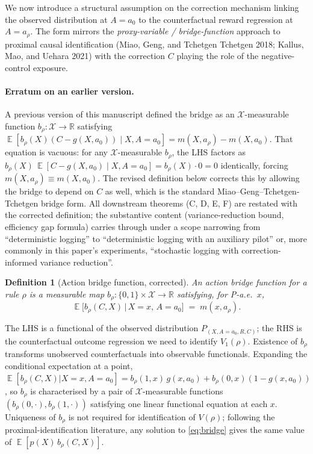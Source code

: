 \documentclass[11pt]{article}
\newtheorem{definition}{Definition}
\DeclareMathOperator{\E}{\mathbb{E}}
\begin{document}
We now introduce a structural assumption on the correction mechanism
linking the observed distribution at $A = a_0$ to the counterfactual
reward regression at $A = a_\rho$.  The form mirrors the
\emph{proxy-variable / bridge-function} approach to proximal causal
identification (Miao, Geng, and Tchetgen Tchetgen 2018; Kallus, Mao,
and Uehara 2021) with the correction $C$ playing the role of the
negative-control exposure.

\paragraph{Erratum on an earlier version.}
A previous version of this manuscript defined the bridge as an
$\mathcal{X}$-measurable function $b_\rho: \mathcal{X} \to \mathbb{R}$
satisfying $\E[b_\rho(X)(C - g(X, a_0)) \mid X, A = a_0] = m(X, a_\rho) - m(X, a_0)$.
That equation is vacuous: for any $\mathcal{X}$-measurable $b_\rho$,
the LHS factors as $b_\rho(X)\,\E[C - g(X, a_0) \mid X, A = a_0] = b_\rho(X)\cdot 0 = 0$
identically, forcing $m(X, a_\rho) \equiv m(X, a_0)$.  The revised
definition below corrects this by allowing the bridge to depend on $C$
as well, which is the standard Miao--Geng--Tchetgen-Tchetgen bridge
form.  All downstream theorems (C, D, E, F) are restated with the
corrected definition; the substantive content (variance-reduction
bound, efficiency gap formula) carries through under a scope
narrowing from ``deterministic logging'' to ``deterministic logging
with an auxiliary pilot'' or, more commonly in this paper's
experiments, ``stochastic logging with correction-informed variance
reduction''.

\begin{definition}[Action bridge function, corrected]\label{def:bridge}
An \emph{action bridge function} for a rule $\rho$ is a measurable
map $b_\rho: \{0, 1\} \times \mathcal{X} \to \mathbb{R}$ satisfying,
for P-a.e.\ $x$,
\begin{equation}
\E\bigl[b_\rho(C, X) \,\big|\, X = x,\, A = a_0\bigr]
\;=\; m(x, a_\rho).
\label{eq:bridge}
\end{equation}
\end{definition}

The LHS is a functional of the observed distribution
$P_{(X, A=a_0, R, C)}$; the RHS is the counterfactual outcome
regression we need to identify $V_1(\rho)$.  Existence of $b_\rho$
transforms unobserved counterfactuals into observable functionals.
Expanding the conditional expectation at a point,
$\E[b_\rho(C, X) | X = x, A = a_0] = b_\rho(1, x)\,g(x, a_0) + b_\rho(0, x)(1 - g(x, a_0))$,
so $b_\rho$ is characterised by a pair of $\mathcal{X}$-measurable
functions $(b_\rho(0, \cdot), b_\rho(1, \cdot))$ satisfying one
linear functional equation at each $x$.  Uniqueness of $b_\rho$ is
not required for identification of $V(\rho)$; following the
proximal-identification literature, any solution to \eqref{eq:bridge}
gives the same value of $\E[p(X)\, b_\rho(C, X)]$.
\end{document}
